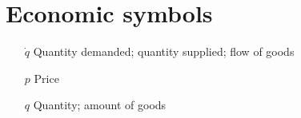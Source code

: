 \section*{Economic symbols}
\begin{itemize}[itemsep=0pt, leftmargin=2cm, labelsep=0cm, labelwidth=1.9cm, align=left]
%
    \item[$\dot{q}$] Quantity demanded; quantity supplied; flow of goods
    \item[$p$] Price
    \item[$q$] Quantity; amount of goods
%
%
%
\end{itemize}